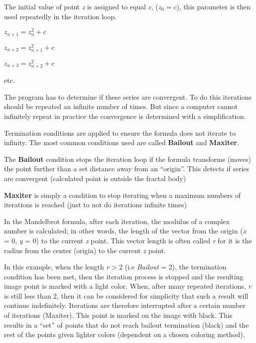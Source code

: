 The initial value of point \emph{z} is assigned to equal \emph{c}, ($ z_{0} = c
$), this parameter is then used repeatedly in the iteration loop.

\begin{center}
	\(z_{n + 1} = z_{n}^{2} + c\)
	
	\(z_{n + 2} = z_{n + 1}^{2} + c\)
	
	\(z_{n + 3} = z_{n + 2}^{2} + c\)
	
	etc.
\end{center}

The program has to determine if these series are convergent. To do this
iterations should be repeated an infinite number of times. But since a computer cannot
infinitely repeat in practice the convergence is determined with a simplification.

Termination conditions are applied to ensure the formula does not iterate to
infinity. The most common conditions used are called \textbf{Bailout} and
\textbf{Maxiter}.

\label{bailout-maxiter}The \textbf{Bailout} condition stops the iteration loop if the formula
transforms (moves) the point further than a set distance away from an
``origin''. This detects if series are convergent (calculated point is outside
the fractal body)

\textbf{Maxiter} is simply a condition to stop iterating when a maximum numbers
of iterations is reached (just to not do iterations infinite times)

In the Mandelbrot formula, after each iteration, the modulus of a complex number
is calculated; in other words, the length of the vector from the origin
(\emph{x} = 0, \emph{y} = 0) to the current \emph{z} point. This vector length
is often called \emph{r} for it is the radius from the center (origin) to the
current \emph{z} point.

In this example, when the length \emph{r} \textgreater{} 2 (i.e \emph{Bailout} =
2), the termination condition has been met, then the iteration process is
stopped and the resulting image point is marked with a light color. When, after
many repeated iterations, \emph{r} is still less than 2, then it can be
considered for simplicity that such a result will continue indefinitely.
Iterations are therefore interrupted after a certain number of iterations
(Maxiter). This point is marked on the image with black. This results in a
``set'' of points that do not reach bailout termination (black) and the rest of
the points given lighter colors (dependent on a chosen coloring method).

